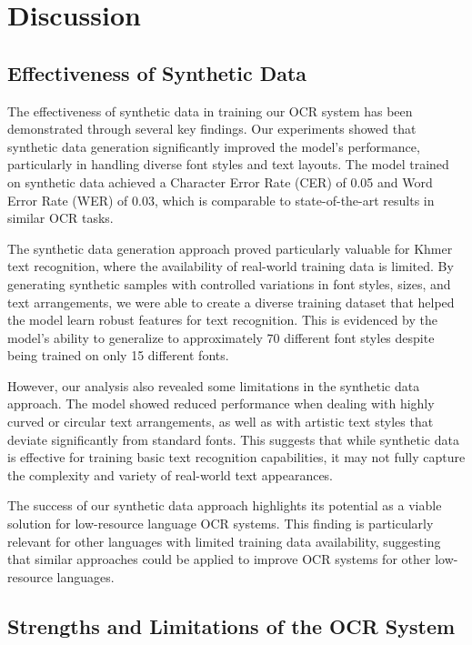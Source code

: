 \chapter{Discussion}
\label{ch:discussion}

\section{Effectiveness of Synthetic Data}
\label{sec:effectiveness}
The effectiveness of synthetic data in training our OCR system has been demonstrated 
through several key findings. Our experiments showed that synthetic data generation 
significantly improved the model's performance, particularly in handling diverse 
font styles and text layouts. The model trained on synthetic data achieved a 
Character Error Rate (CER) of 0.05 and Word Error Rate (WER) of 0.03, which is 
comparable to state-of-the-art results in similar OCR tasks.

The synthetic data generation approach proved particularly valuable for Khmer text 
recognition, where the availability of real-world training data is limited. 
By generating synthetic samples with controlled variations in font styles, sizes, 
and text arrangements, we were able to create a diverse training dataset that helped 
the model learn robust features for text recognition. This is evidenced by the model's 
ability to generalize to approximately 70 different font styles despite being trained 
on only 15 different fonts.

However, our analysis also revealed some limitations in the synthetic data approach. 
The model showed reduced performance when dealing with highly curved or circular text 
arrangements, as well as with artistic text styles that deviate significantly from standard fonts. 
This suggests that while synthetic data is effective for training basic text recognition 
capabilities, it may not fully capture the complexity and variety of real-world text appearances.

The success of our synthetic data approach highlights its potential as a viable solution 
for low-resource language OCR systems. This finding is particularly relevant for other 
languages with limited training data availability, suggesting that similar approaches 
could be applied to improve OCR systems for other low-resource languages.

\section{Strengths and Limitations of the OCR System}
\label{sec:strengths}

